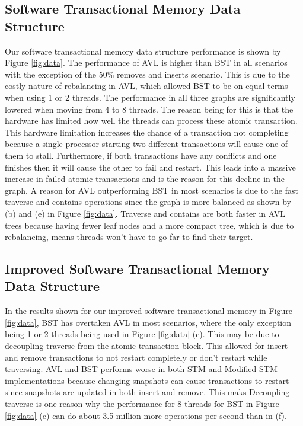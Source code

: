 \documentclass[conference]{IEEEtran}
\theoremstyle{definition}
\theoremstyle{theorem}
\begin{document}
\subsection{Software Transactional Memory Data Structure}
Our software transactional memory data structure performance is shown by Figure \ref{fig:data}. The performance of AVL is higher than BST in all scenarios with the exception of the 50\% removes and inserts scenario. This is due to the costly nature of rebalancing in AVL, which allowed BST to be on equal terms when using 1 or 2 threads. The performance in all three graphs are significantly lowered when moving from 4 to 8 threads. The reason being for this is that the hardware has limited how well the threads can process these atomic transaction. This hardware limitation increases the chance of a transaction not completing because a single processor starting two different transactions will cause one of them to stall. Furthermore, if both transactions have any conflicts and one finishes then it will cause the other to fail and restart. This leads into a massive increase in failed atomic transactions and is the reason for this decline in the graph. A reason for AVL outperforming BST in most scenarios is due to the fast traverse and contains operations since the graph is more balanced as shown by (b) and (e) in Figure \ref{fig:data}. Traverse and contains are both faster in AVL trees because having fewer leaf nodes and a more compact tree, which is due to rebalancing, means threads won't have to go far to find their target.


\subsection{Improved Software Transactional Memory Data Structure}
In the results shown for our improved software transactional memory in Figure \ref{fig:data}, BST has overtaken AVL in most scenarios, where the only exception being 1 or 2 threads being used in Figure \ref{fig:data} (c). This may be due to decoupling traverse from the atomic transaction block. This allowed for insert and remove transactions to not restart completely or don't restart while traversing. AVL and BST performs worse in both STM and Modified STM implementations because changing snapshots can cause transactions to restart since snapshots are updated in both insert and remove. This maks Decoupling traverse is one reason why the performance for 8 threads for BST in Figure \ref{fig:data} (c) can do about 3.5 million more operations per second than in (f). 
\end{document}
